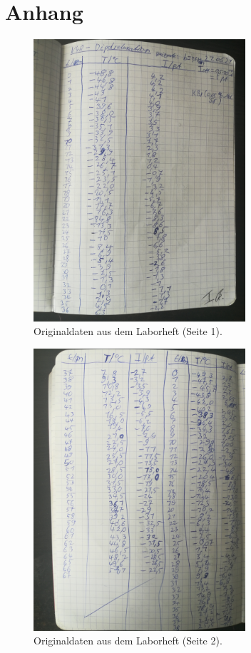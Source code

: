 \newpage
\section{Anhang}
\begin{figure}
    \centering
    \includegraphics[width=0.7\textwidth]{content/data/daten1.jpg}
    \caption{Originaldaten aus dem Laborheft (Seite 1).}
\end{figure}
\begin{figure}
    \centering
    \includegraphics[width=0.7\textwidth]{content/data/daten2.jpg}
    \caption{Originaldaten aus dem Laborheft (Seite 2).}
\end{figure}

